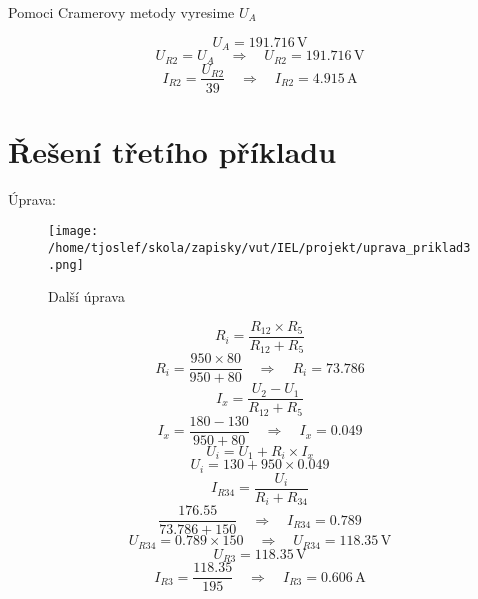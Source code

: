 \documentclass{article}
\begin{document}
Pomoci Cramerovy metody vyresime \( U_A \)

\[
    U_A = 191.716 \, \text{V}
\]
\[
    U_{R2} = U_A  \quad \Rightarrow \quad U_{R2} = 191.716 \, \text{V}
\]
\[
    I_{R2} = \frac{U_{R2}}{39} \quad \Rightarrow \quad I_{R2} = 4.915 \, \text{A}
\]
\section{Řešení třetího příkladu}
Úprava:

\begin{figure}[!ht]
  \centering
  \texttt{[image: /home/tjoslef/skola/zapisky/vut/IEL/projekt/uprava\_priklad3.png]}
  \caption{Další úprava}
  \label{fig:upravapriklad3}
\end{figure}

\[
    R_i = \frac{R_{12} \times R_5}{R_{12} + R_5}
\]
\[
    R_i = \frac{950 \times 80}{950 + 80} \quad \Rightarrow \quad R_i = 73.786
\]
\[
    I_x = \frac{U_2 - U_1}{R_{12} + R_5}
\]
\[
    I_x = \frac{180 - 130}{950 + 80} \quad \Rightarrow \quad I_x = 0.049
\]
\[
    U_i = U_1 + R_i \times I_x
\]
\[
    U_i = 130 + 950 \times 0.049
\]
\[
    I_{R34} = \frac{U_i}{R_i + R_{34}}
\]
\[
    \frac{176.55}{73.786 + 150} \quad \Rightarrow \quad I_{R34} = 0.789
\]
\[
    U_{R34} = 0.789 \times 150 \quad \Rightarrow \quad U_{R34} = 118.35 \, \text{V}
\]
\[
    U_{R3} = 118.35 \, \text{V}
\]
\[
    I_{R3} = \frac{118.35}{195} \quad \Rightarrow \quad I_{R3} = 0.606 \, \text{A}
\]
\end{document}

